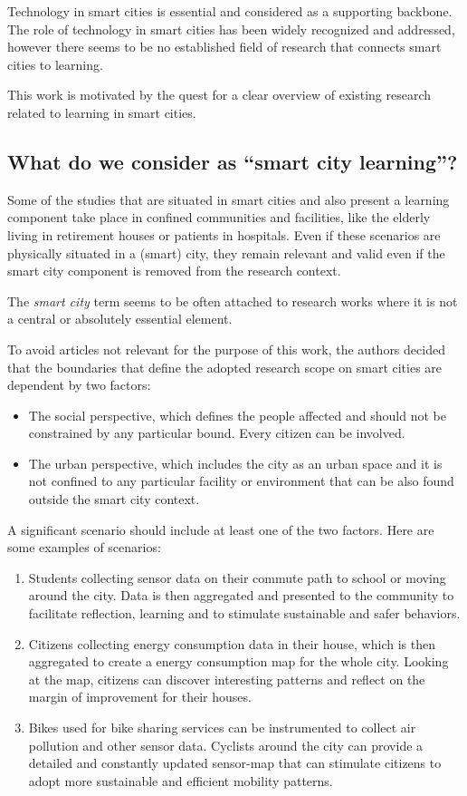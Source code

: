 Technology in smart cities is essential and considered as a supporting backbone\cite{giovannella_smart_2014}.
The role of technology in smart cities has been widely recognized and addressed, however there seems to be no established field of research that connects smart cities to learning.

This work is motivated by the quest for a clear overview of existing research related to learning in smart cities.


\subsection{What do we consider as ``smart city learning''?} \label{subsec:definition}
Some of the studies that are situated in smart cities and also present a learning component take place in confined communities and facilities, like the elderly living in retirement houses or patients in hospitals. Even if these scenarios are physically situated in a (smart) city, they remain relevant and valid even if the smart city component is removed from the research context.

The \textit{smart city} term seems to be often attached to research works where it is not a central or absolutely essential element.

To avoid articles not relevant for the purpose of this work, the authors decided that the boundaries that define the adopted research scope on smart cities are dependent by two factors:

\begin{itemize}
\item The social perspective, which defines the people affected and should not be constrained by any particular bound. Every citizen can be involved.
\item The urban perspective, which includes the city as an urban space and it is not confined to any particular facility or environment that can be also found outside the smart city context.
\end{itemize}

A significant scenario should include at least one of the two factors. Here are some examples of scenarios:

\begin{enumerate}
\item Students collecting sensor data on their commute path to school or moving around the city. Data is then aggregated and presented to the community to facilitate reflection, learning and to stimulate sustainable and safer behaviors.
\item Citizens collecting energy consumption data in their house, which is then aggregated to create a energy consumption map for the whole city. Looking at the map, citizens can discover interesting patterns and reflect on the margin of improvement for their houses.
\item Bikes used for bike sharing services can be instrumented to collect air pollution and other sensor data. Cyclists around the city can provide a detailed and constantly updated sensor-map that can stimulate citizens to adopt more sustainable and efficient mobility patterns.
\end{enumerate}

